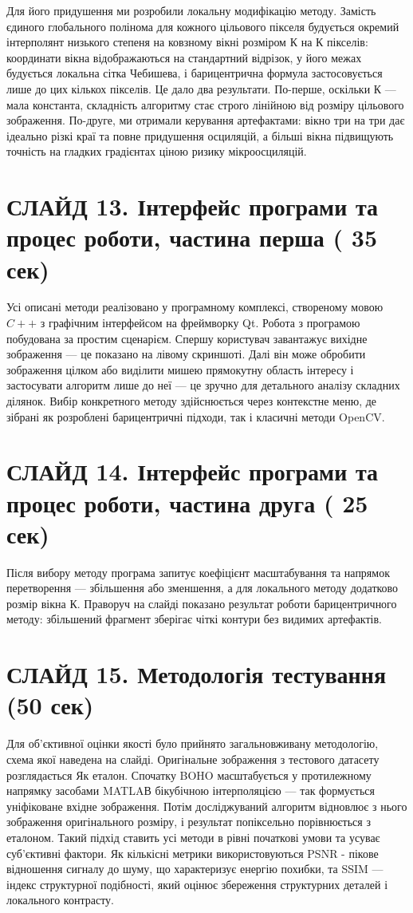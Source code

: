 \documentclass[12pt,a4paper]{article}
\begin{document}
	Для його придушення ми розробили локальну модифікацію методу. Замість єдиного глобального полінома для кожного цільового пікселя будується окремий інтерполянт низького степеня на ковзному вікні розміром К на К пікселів: координати вікна відображаються на стандартний відрізок, у його межах будується локальна сітка Чебишева, і барицентрична формула застосовується лише до цих кількох пікселів. Це дало два результати. По-перше, оскільки К — мала константа, складність алгоритму стає строго лінійною від розміру цільового зображення. По-друге, ми отримали керування артефактами: вікно три на три дає ідеально різкі краї та повне придушення осциляцій, а більші вікна підвищують точність на гладких градієнтах ціною ризику мікроосциляцій.
	
	\section*{СЛАЙД 13. Інтерфейс програми та процес роботи, частина перша ( 35 сек)}
	Усі описані методи реалізовано у програмному комплексі, створеному мовою $C++$ з графічним інтерфейсом на фреймворку Qt. Робота з програмою побудована за простим сценарієм. Спершу користувач завантажує вихідне зображення — це показано на лівому скриншоті. Далі він може обробити зображення цілком або виділити мишею прямокутну область інтересу і застосувати алгоритм лише до неї — це зручно для детального аналізу складних ділянок. Вибір конкретного методу здійснюється через контекстне меню, де зібрані як розроблені барицентричні підходи, так і класичні методи OpenCV.
	
	\section*{СЛАЙД 14. Інтерфейс програми та процес роботи, частина друга ( 25 сек)}
	Після вибору методу програма запитує коефіцієнт масштабування та напрямок перетворення — збільшення або зменшення, а для локального методу додатково розмір вікна К. Праворуч на слайді показано результат роботи барицентричного методу: збільшений фрагмент зберігає чіткі контури без видимих артефактів.
	
	\section*{СЛАЙД 15. Методологія тестування (50 сек)}
	Для об'єктивної оцінки якості було прийнято загальновживану методологію, схема якої наведена на слайді. Оригінальне зображення з тестового датасету розглядається Як еталон. Спочатку BOHO масштабується у протилежному напрямку засобами MATLAВ бікубічною інтерполяцією — так формується уніфіковане вхідне зображення. Потім досліджуваний алгоритм відновлює з нього зображення оригінального розміру, і результат попіксельно порівнюється з еталоном. Такий підхід ставить усі методи в рівні початкові умови та усуває суб'єктивні фактори. Як кількісні метрики використовуються PSNR - пікове відношення сигналу до шуму, що характеризує енергію похибки, та SSIM — індекс структурної подібності, який оцінює збереження структурних деталей і локального контрасту.
	
\end{document}
